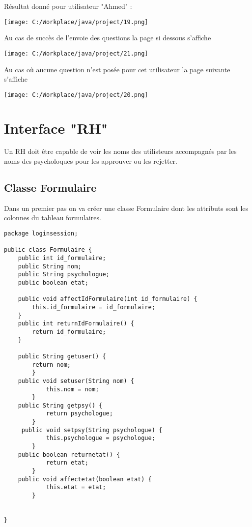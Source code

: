 \documentclass[12]{article}
\begin{document}
Résultat donné pour utilisateur "Ahmed" :\\

\begin{center}
\texttt{[image: C:/Workplace/java/project/19.png]}
\end{center}


Au cas de succès de l'envoie des questions la page si dessous s'affiche

\begin{center}
\texttt{[image: C:/Workplace/java/project/21.png]}
\end{center}


Au cas où aucune question n'est posée pour cet utilisateur la page suivante s'affiche

\begin{center}
\texttt{[image: C:/Workplace/java/project/20.png]}
\end{center}

\section{Interface "RH"}

Un RH doit être capable de voir les noms des utilisteurs accompagnés par les noms des psycholoques
pour les approuver ou les rejetter. 
\subsection{Classe Formulaire}

Dans un premier pas on va créer une classe Formulaire dont les attributs sont les colonnes du tableau formulaires.
\begin{scriptsize}

\lstset{language=java}
\begin{lstlisting}
package loginsession;

public class Formulaire {
	public int id_formulaire;
	public String nom;
	public String psychologue;
	public boolean etat;
	
	public void affectIdFormulaire(int id_formulaire) {
		this.id_formulaire = id_formulaire;
	}
	public int returnIdFormulaire() {
		return id_formulaire;
	}
	
	public String getuser() {
		return nom;
		}
	public void setuser(String nom) {
	        this.nom = nom;
	    }
	public String getpsy() {
	        return psychologue;
	    }
	 public void setpsy(String psychologue) {
	        this.psychologue = psychologue;
	    }
    public boolean returnetat() {
			return etat;
		}
    public void affectetat(boolean etat) {
			this.etat = etat;
		}
		

}
\end{lstlisting}
\end{scriptsize}
\end{document}
